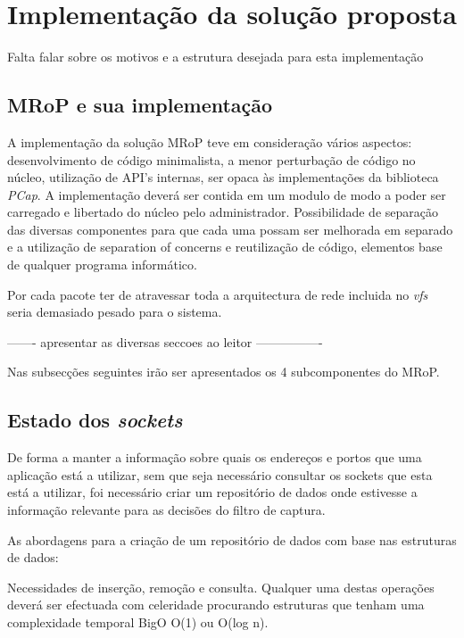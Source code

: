 \chapter{Implementação da solução proposta}
\label{cap:Implementacao}

Falta falar sobre os motivos e a estrutura desejada para esta implementação

\section{MRoP e sua implementação}
\label{sec:mrop_implementation}

A implementação da solução MRoP teve em consideração vários aspectos: desenvolvimento de código minimalista, a menor perturbação de código no núcleo, utilização de API's internas, ser opaca às implementações da biblioteca \textit{PCap}.
A implementação deverá ser contida em um modulo de modo a poder ser carregado e libertado do núcleo pelo administrador.
Possibilidade de separação das diversas componentes para que cada uma possam ser melhorada em separado e a utilização de separation of concerns e reutilização de código, elementos base de qualquer programa informático.

Por cada pacote ter de atravessar toda a arquitectura de rede incluida no \textit{vfs} seria demasiado pesado para o sistema.

------- apresentar as diversas seccoes ao leitor ----------------

Nas subsecções seguintes irão ser apresentados os 4 subcomponentes do MRoP.


\section{Estado dos \textit{sockets}}

De forma a manter a informação sobre quais os endereços e portos que uma aplicação está a utilizar, sem que seja necessário consultar os sockets que esta está a utilizar, foi necessário criar um repositório de dados onde estivesse a informação relevante para as decisões do filtro de captura.

As abordagens para a criação de um repositório de dados com base nas estruturas de dados:

Necessidades de inserção, remoção e consulta. Qualquer uma destas operações deverá ser efectuada com celeridade procurando estruturas que tenham uma complexidade temporal BigO O(1) ou O(log n).

